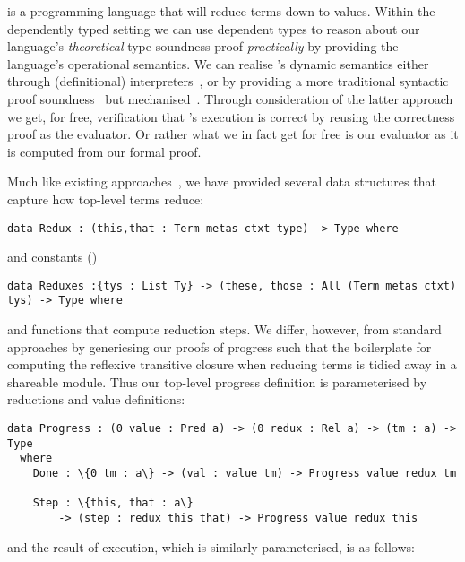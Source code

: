 
\Velo{} is a programming language that will reduce terms down to values.
Within the dependently typed setting we can use dependent types to reason about our language's \emph{theoretical} type-soundness proof \emph{practically} by providing the language's operational semantics.
We can realise \Velo{}'s dynamic semantics either through (definitional) interpreters~\cite{10.1145/3093333.3009866,Augustsson1999edt}, or by providing a more traditional syntactic proof soundness~\cite{DBLP:journals/iandc/WrightF94} but mechanised~\cite[Part 2: Properties]{plfa22.08}.
Through consideration of the latter approach we get, for free, verification that \Velo{}'s execution is correct by reusing the correctness proof as the evaluator.
Or rather what we in fact get for free is our evaluator as it is computed from our formal proof.

Much like existing approaches~\cite[Part 2: Properties]{plfa22.08}, we have provided several data structures that capture how top-level terms reduce:

\begin{Verbatim}
data Redux : (this,that : Term metas ctxt type) -> Type where
\end{Verbatim}

\noindent
and constants ()

\begin{Verbatim}
data Reduxes :{tys : List Ty} -> (these, those : All (Term metas ctxt) tys) -> Type where
\end{Verbatim}

\noindent
and functions that compute reduction steps.
We differ, however, from standard approaches by genericsing our proofs of progress such that the boilerplate for computing the reflexive transitive closure when reducing terms is tidied away in a shareable module.
Thus our top-level progress definition is parameterised by reductions and value definitions:

\begin{Verbatim}
data Progress : (0 value : Pred a) -> (0 redux : Rel a) -> (tm : a) -> Type
  where
    Done : \{0 tm : a\} -> (val : value tm) -> Progress value redux tm

    Step : \{this, that : a\}
        -> (step : redux this that) -> Progress value redux this
\end{Verbatim}

\noindent
and the result of execution, which is similarly parameterised, is as follows:

